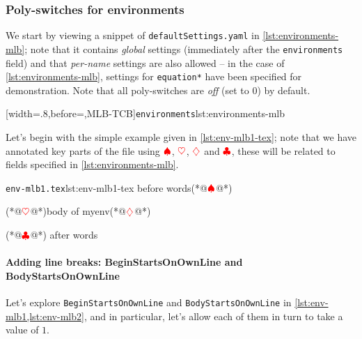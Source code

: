 \subsubsection{Poly-switches for environments}\label{sec:modifylinebreaks-environments}
	We start by viewing a snippet of \texttt{defaultSettings.yaml} in
	\cref{lst:environments-mlb}; note that it contains \emph{global} settings (immediately
	after the \texttt{environments} field) and that \emph{per-name} settings are also allowed
	-- in the case of \cref{lst:environments-mlb}, settings for \texttt{equation*} have been
	specified for demonstration. Note that all poly-switches are \emph{off} (set to 0) by
	default.   

	[width=.8\linewidth,before=\centering,MLB-TCB]{\texttt{environments}}{lst:environments-mlb}

	Let's begin with the simple example given in \cref{lst:env-mlb1-tex}; note that we have
	annotated key parts of the file using $\color{red}\spadesuit$, $\color{red}\heartsuit$,
	$\color{red}\diamondsuit$ and $\color{red}\clubsuit$, these will be related to fields
	specified in \cref{lst:environments-mlb}. 

	\begin{cmhlistings}[style=tcblatex,escapeinside={(*@}{@*)}]{\texttt{env-mlb1.tex}}{lst:env-mlb1-tex}
before words(*@$\color{red}\spadesuit$@*) \begin{myenv}(*@$\color{red}\heartsuit$@*)body of myenv(*@$\color{red}\diamondsuit$@*)\end{myenv}(*@$\color{red}\clubsuit$@*) after words
\end{cmhlistings}

	\paragraph{Adding line breaks: BeginStartsOnOwnLine and BodyStartsOnOwnLine}
		Let's explore \texttt{BeginStartsOnOwnLine} and \texttt{BodyStartsOnOwnLine} in
		\cref{lst:env-mlb1,lst:env-mlb2}, and in particular, let's allow each of them in turn to
		take a value of $1$.  

